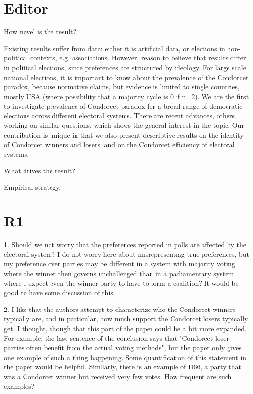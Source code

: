 \documentclass[a4paper, 12pt]{scrartcl}
\theoremstyle{break}
\newenvironment{changes}{\par\color{violet}\par\addvspace{\baselineskip}}{\par\addvspace{\baselineskip}}
\begin{document}
\section{Editor}
\begin{changes}
How novel is the result?
\end{changes}
Existing results suffer from data: either it is artificial data, or elections in non-political contexts, e.g. associations. However, reason to believe that results differ in political elections, since preferences are structured by ideology. For large scale national elections, it is important to know about the prevalence of the Condorcet paradox, because normative claims, but evidence is limited to single countries, mostly USA (where possibility that a majority cycle is 0 if n=2). We are the first to investigate prevalence of Condorcet paradox for a broad range of democratic elections across different electoral systems.
There are recent advances, others working on similar questions, which shows the general interest in the topic.
Our contribution is unique in that we also present descriptive results on the identity of Condorcet winners and losers, and on the Condorcet efficiency of electoral systems. 

\begin{changes}
	What drives the result?
\end{changes}


\begin{changes}
	Empirical strategy.
\end{changes}

\section{R1} 
\begin{changes}
1. Should we not worry that the preferences reported in polls are affected by the electoral system? I do not worry here about misrepresenting true preferences, but my preference over parties may be different in a system with majority voting where the winner then governs unchallenged than in a parliamentary system where I expect even the winner party to have to form a coalition? It would be good to have some discussion of this.
\end{changes}


\begin{changes}
	2. I like that the authors attempt to characterize who the Condorcet winners typically are, and in particular, how much support the Condorcet losers typically get. I thought, though that this part of the paper could be a bit more expanded. For example, the last sentence of the conclusion says that "Condorcet loser parties often benefit from the actual voting methods", but the paper only gives one example of such a thing happening. Some quantification of this statement in the paper would be helpful. Similarly, there is an example of D66, a party that was a Condorcet winner but received very few votes. How frequent are such examples?
\end{changes}
\end{document}
